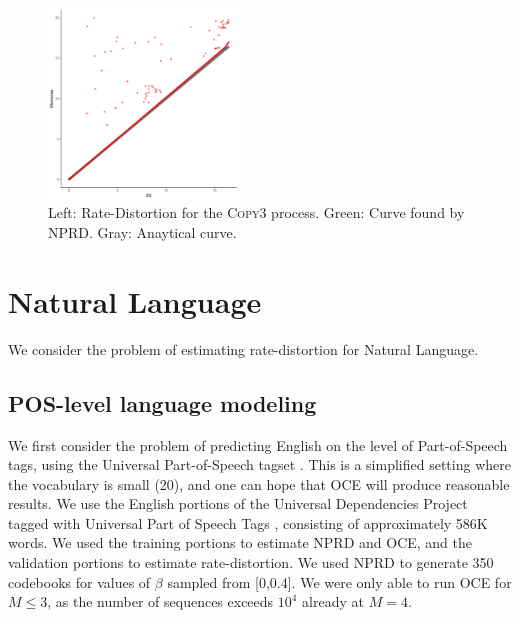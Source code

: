 \documentclass[11pt,letterpaper]{article}
\begin{document}
\begin{figure}
\includegraphics[width=0.45\textwidth]{cryptfig/repeat3-ee-mem-frontier.pdf}
	\caption{Left: Rate-Distortion for the \textsc{Copy3} process. Green: Curve found by NPRD. Gray: Anaytical curve.}\label{fig:repeat}
\end{figure}



\section{Natural Language}

We consider the problem of estimating rate-distortion for Natural Language.
%
%
%
%
%

\subsection{POS-level language modeling}

We first consider the problem of predicting English on the level of Part-of-Speech tags, using the Universal Part-of-Speech tagset \citep{petrov-universal-2012}. 
This is a simplified setting where the vocabulary is small (20), and one can hope that OCE will produce reasonable results.
We use the English portions of the Universal Dependencies Project~\citep{nivre-universal-2017} tagged with Universal Part of Speech Tags \citep{petrov-universal-2012}, consisting of approximately 586K words.
We used the training portions to estimate NPRD and OCE, and the validation portions to estimate rate-distortion.
We used NPRD to generate 350 codebooks for values of $\beta$ sampled from [0,0.4].
We were only able to run OCE for $M \leq 3$, as the number of sequences exceeds $10^4$ already at $M=4$.
\end{document}
